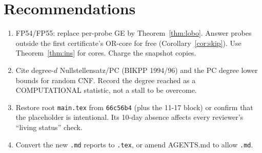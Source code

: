 \documentclass[11pt]{article}
\theoremstyle{definition}
\begin{document}
\section{Recommendations}
\begin{enumerate}
\item FP54/FP55: replace per-probe GE by Theorem~\ref{thm:lobo}. Answer probes outside the first certificate's OR-core for free (Corollary~\ref{cor:skip}). Use Theorem~\ref{thm:ins} for cores. Charge the snapshot copies.
\item Cite degree-$d$ Nullstellensatz/PC (BIKPP 1994/96) and the PC degree lower bounds for random CNF. Record the degree reached as a COMPUTATIONAL statistic, not a stall to be overcome.
\item Restore root \texttt{main.tex} from \texttt{66c56b4} (plus the 11-17 block) or confirm that the placeholder is intentional. Its 10-day absence affects every reviewer's ``living status'' check.
\item Convert the new \texttt{.md} reports to \texttt{.tex}, or amend AGENTS.md to allow \texttt{.md}.
\end{enumerate}
\end{document}
